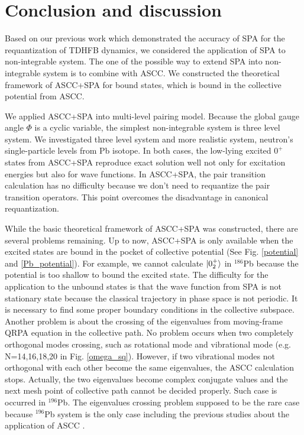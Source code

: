 \documentclass[%
superscriptaddress,
showpacs,
nofootinbib,
amsmath,amssymb,
aps,
prc,
twocolumn,
floatfix ]%
{revtex4-1}
\begin{document}
\section{Conclusion and discussion}
Based on our previous work which demonstrated the accuracy of SPA for the requantization of TDHFB dynamics, we considered the application of SPA to non-integrable system. The one of the possible way to extend SPA into non-integrable system is to combine with ASCC. We constructed the theoretical framework of ASCC+SPA for bound states, which is bound in the collective potential from ASCC. 

We applied ASCC+SPA into multi-level pairing model. Because the global gauge angle $\Phi$ is a cyclic variable, the simplest non-integrable system is three level system. We investigated three level system and more realistic system, neutron's single-particle levels from Pb isotope. In both cases, the low-lying excited $0^+$ states from ASCC+SPA reproduce exact solution well not only for excitation energies but also for wave functions. In ASCC+SPA, the pair transition calculation has no difficulty because we don't need to requantize the pair transition operators. This point overcomes the disadvantage in canonical requantization.

While the basic theoretical framework of ASCC+SPA was constructed, there are several problems remaining. Up to now, ASCC+SPA is only available when the excited states are bound in the pocket of collective potential (See Fig. \ref{potential} and \ref{Pb_potential}). For example, we cannot calculate $\ket{0_2^+}$ in ${}^{186}$Pb because the potential is too shallow to bound the excited state. The difficulty for the application to the unbound states is that the wave function from SPA is not stationary state because the classical trajectory in phase space is not periodic. It is necessary to find some proper boundary conditions in the collective subspace. Another problem is about the crossing of the eigenvalues from moving-frame QRPA equation in the collective path. No problem occurs when two completely orthogonal modes crossing, such as rotational mode and vibrational mode (e.g. N=14,16,18,20 in Fig. \ref{omega_sq}). However, if two vibrational modes not orthogonal with each other become the same eigenvalues, the ASCC calculation stops. Actually, the two eigenvalues become complex conjugate values and the next mesh point of collective path cannot be decided properly. Such case is occurred in ${}^{196}$Pb. The eigenvalues crossing problem supposed to be the rare case because ${}^{196}$Pb system is the only case including the previous studies about the application of ASCC \cite{}.
\end{document}
